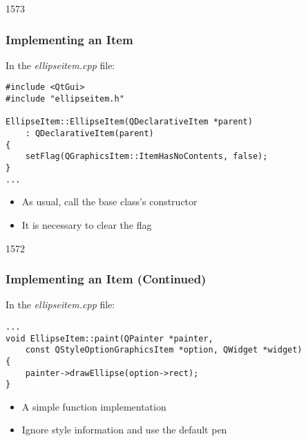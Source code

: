 \begin{slide}[fragile]{1573}\frametitle{Implementing an Item}

In the \textit{ellipseitem.cpp} file:

\vspace*{0.5em}
\begin{lstlisting}
#include <QtGui>
#include "ellipseitem.h"

EllipseItem::EllipseItem(QDeclarativeItem *parent)
    : QDeclarativeItem(parent)
{
    setFlag(QGraphicsItem::ItemHasNoContents, false);
}
...
\end{lstlisting}

\begin{itemize}
\item As usual, call the base class's constructor
\item It is necessary to clear the 
      flag
\end{itemize}

\end{slide}

\begin{slide}[fragile]{1572}\frametitle{Implementing an Item (Continued)}

In the \textit{ellipseitem.cpp} file:

\vspace*{0.5em}
\begin{lstlisting}
...
void EllipseItem::paint(QPainter *painter,
    const QStyleOptionGraphicsItem *option, QWidget *widget)
{
    painter->drawEllipse(option->rect);
}
\end{lstlisting}

\begin{itemize}
\item A simple  function implementation
\item Ignore style information and use the default pen
\end{itemize}

\end{slide}

